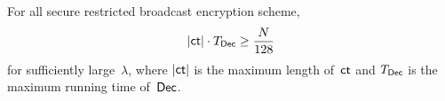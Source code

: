 \begin{theorem}\label{thm:lower-bound}
For all secure restricted broadcast encryption scheme,
\begin{align*}
|\ct|\cdot\TDec\geq\frac{N}{128}
\end{align*}
for sufficiently large~$\lambda$,
where $|\ct|$ is the maximum length of~$\ct$ and
$\TDec$ is the maximum running time of~$\Dec$.
\end{theorem}
